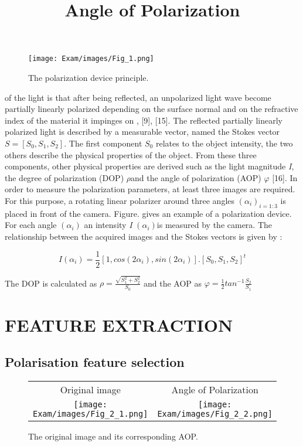 \documentclass[10pt,twocolumn,letterpaper]{article}
\begin{document}
\nocite{*}

\begin{figure}
    \centering
        \texttt{[image: Exam/images/Fig\_1.png]} 
    \caption{The polarization device principle.}
    \label{fig:fig_1}
\end{figure}


of the light is that after being reflected, an unpolarized light
wave become partially linearly polarized depending on the
surface normal and on the refractive index of the material it
impinges on \cite{_8_}, [9], [15]. The reflected partially linearly
polarized light is described by a measurable vector, named
the Stokes vector $S = [S_{0},S_{1},S_{2}]$.  The first component $S_{0}$ relates to the object intensity, the two others describe the
physical properties of the object. From these three components, other physical properties are derived such as the light
magnitude \textit{I}, the degree of polarization (DOP) $\rho$and the
angle of polarization (AOP) $\varphi$ [16]. In order to measure the
polarization parameters, at least three images are required.
For this purpose, a rotating linear polarizer around three angles $(\alpha_{i})_{i=1:3}$ is placed in front of the camera. Figure. gives
an example of a polarization device. For each angle $(\alpha_{i})$  an
intensity \textit{I} $(\alpha_{i})$is measured by the camera. The relationship
between the acquired images and the Stokes vectors is given
by :

\begin{equation}
    \textit{I}(\alpha_{i}) = \frac{1}{2}[1,cos(2\alpha_{i}),sin(2\alpha_{i})].[S_{0},S_{1},S_{2}]^t
\end{equation}

The DOP is calculated as $\rho = \frac{\sqrt{S_{1}^2+S_{2}^2}}{S_{0}}$ and the AOP as $\varphi = \frac{1}{2}tan^{-1}\frac{S_{2}}{S_{1}}$


\section{FEATURE EXTRACTION}
\subsection{Polarisation feature selection}

\begin{figure}
    \centering
    \begin{tabular}{c c} %
        Original image & Angle of Polarization \\
        \texttt{[image: Exam/images/Fig\_2\_1.png]} &
        \title{Angle of Polarization}
        \texttt{[image: Exam/images/Fig\_2\_2.png]} 
    \end{tabular}
    \caption{The original image and its corresponding AOP.}
    \label{fig:fig2}
\end{figure}
\end{document}
